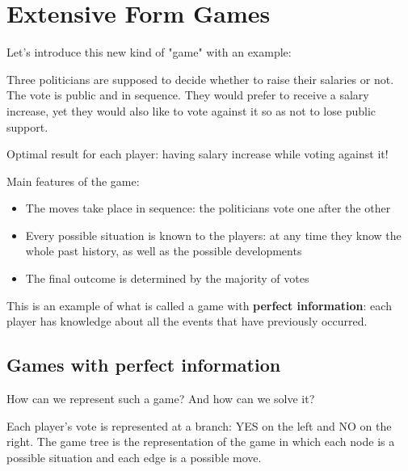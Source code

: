 \documentclass[../main.tex]{subfiles}
\begin{document}
\chapter{Extensive Form Games}
Let's introduce this new kind of "game" with an example:
\begin{example}
    Three politicians are supposed to decide whether to raise their salaries or not. The vote is public and in sequence. They would prefer to receive a salary increase, yet they would also like to vote against it so as not to lose public support.
\end{example}

Optimal result for each player: having salary increase while voting against it!

Main features of the game:
\begin{itemize}
    \item The moves take place in sequence: the politicians vote one after the other
    \item Every possible situation is known to the players: at any time they know the whole past history, as well as the possible developments
    \item The final outcome is determined by the majority of votes
\end{itemize}

This is an example of what is called a game with \textbf{perfect information}: each player has knowledge about all the events that have previously occurred.

\section{Games with perfect information}

How can we represent such a game? And how can we solve it?

Each player’s vote is represented at a branch: YES on the left and NO on the right. The game tree is the representation of the game in which each node is a possible situation and each edge is a possible move.
\end{document}
